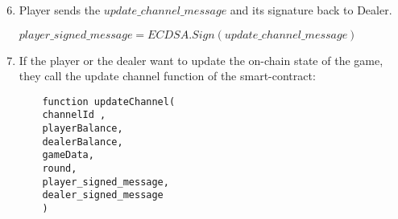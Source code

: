 \begin{algorithm}
\begin{enumerate}
\setcounter{enumi}{5}
\item Player sends the $update\_channel\_message$ and its signature back to Dealer. 
\begin{center}
 $player\_signed\_message = ECDSA.Sign(update\_channel\_message)$
\end{center}
 \item If the player or the dealer want to update the on-chain state of the game, they call the update channel function of the smart-contract:
\begin{lstlisting}
    function updateChannel(
	channelId ,
	playerBalance,
	dealerBalance,
	gameData,
	round,
	player_signed_message,
	dealer_signed_message
    )
\end{lstlisting}
\end{enumerate}
\end{algorithm}

